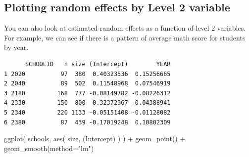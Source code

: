 \documentclass[
  letterpaper,
  DIV=11,
  numbers=noendperiod]{scrreprt}
\newenvironment{Shaded}{}{}
\newcommand{\AttributeTok}[1]{\textcolor[rgb]{0.49,0.56,0.16}{#1}}
\newcommand{\DecValTok}[1]{\textcolor[rgb]{0.25,0.63,0.44}{#1}}
\newcommand{\FunctionTok}[1]{\textcolor[rgb]{0.02,0.16,0.49}{#1}}
\newcommand{\NormalTok}[1]{#1}
\newcommand{\OtherTok}[1]{\textcolor[rgb]{0.00,0.44,0.13}{#1}}
\newcommand{\SpecialCharTok}[1]{\textcolor[rgb]{0.25,0.44,0.63}{#1}}
\newcommand{\StringTok}[1]{\textcolor[rgb]{0.25,0.44,0.63}{#1}}
\begin{document}
\subsection{Plotting random effects by Level 2
variable}\label{plotting-random-effects-by-level-2-variable}

You can also look at estimated random effects as a function of level 2
variables. For example, we can see if there is a pattern of average math
score for students by year.

\begin{Shaded}
\end{Shaded}

\begin{verbatim}
      SCHOOLID   n size (Intercept)        YEAR
1 2020          97  380  0.40323536  0.15256665
2 2040          89  502  0.11548968  0.07546919
3 2180         168  777 -0.08149782 -0.08226312
4 2330         150  800  0.32372367 -0.04388941
5 2340         220 1133 -0.05151408 -0.01128082
6 2380          87  439 -0.17019248  0.10802309
\end{verbatim}

\begin{Shaded}
\begin{Highlighting}[]
\FunctionTok{ggplot}\NormalTok{( schools, }\FunctionTok{aes}\NormalTok{( size, }\StringTok{\textasciigrave{}}\AttributeTok{(Intercept)}\StringTok{\textasciigrave{}}\NormalTok{ ) ) }\SpecialCharTok{+}
  \FunctionTok{geom\_point}\NormalTok{() }\SpecialCharTok{+}
  \FunctionTok{geom\_smooth}\NormalTok{(}\AttributeTok{method=}\StringTok{"lm"}\NormalTok{)}
\end{Highlighting}
\end{Shaded}
\end{document}
